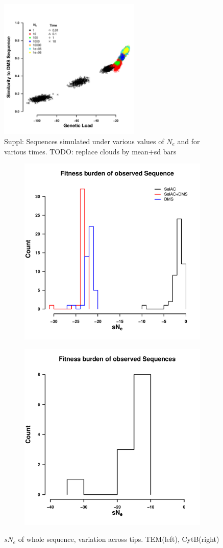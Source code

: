 \documentclass[12pt]{article}
\begin{document}
\begin{figure}[H]
     \centering
	\includegraphics[width=0.6\textwidth]{img/simulated_seqs_gl_dist.pdf}
	\caption{Suppl: Sequences simulated under various values of $N_e$ and for various times. TODO: replace clouds by mean+sd bars}
	\label{fig:sim_seqs}
\end{figure}


\begin{figure}[h]
    \centering
    \begin{subfigure}
        \centering
        \includegraphics[width=.45\textwidth]{img/sNe_TEM2016.pdf}
    \end{subfigure}
    \begin{subfigure}
        \centering
        \includegraphics[width=.45\textwidth]{img/sNe_whale.pdf}
    \end{subfigure}
    \caption{$sN_e$ of whole sequence, variation across tips. TEM(left), CytB(right)}
    \label{fig:gl_TEM_whale}
\end{figure}
\end{document}
